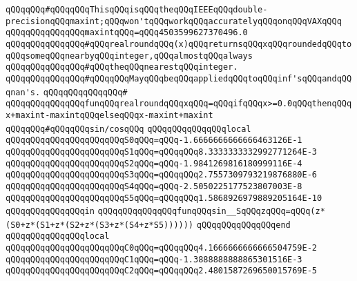 \newline
\verb|qQQqqQQq#qQQqqQQqThisqQQqisqQQqtheqQQqIEEEqQQqdouble-precisionqQQqmaxint;qQQqwon'tqQQqworkqQQqaccuratelyqQQqonqQQqVAXqQQq|\newline
\verb|qQQqqQQqqQQqqQQqmaxintqQQq=qQQq4503599627370496.0|\newline
\newline
\verb|qQQqqQQqqQQqqQQq#qQQqrealroundqQQq(x)qQQqreturnsqQQqxqQQqroundedqQQqtoqQQqsomeqQQqnearbyqQQqinteger,qQQqalmostqQQqalways|\newline
\verb|qQQqqQQqqQQqqQQq#qQQqtheqQQqnearestqQQqinteger.|\newline
\verb|qQQqqQQqqQQqqQQq#qQQqqQQqMayqQQqbeqQQqappliedqQQqtoqQQqinf'sqQQqandqQQqnan's.|\newline
\verb|qQQqqQQqqQQqqQQq#|\newline
\verb|qQQqqQQqqQQqqQQqfunqQQqrealroundqQQqxqQQq=qQQqifqQQqx>=0.0qQQqthenqQQqx+maxint-maxintqQQqelseqQQqx-maxint+maxint|\newline
\newline
\verb|qQQqqQQq#qQQqqQQqsin/cosqQQq|\newline
\verb|qQQqqQQqqQQqqQQqlocal|\newline
\verb|qQQqqQQqqQQqqQQqqQQqqQQqS0qQQq=qQQq-1.6666666666666463126E-1|\newline
\verb|qQQqqQQqqQQqqQQqqQQqqQQqS1qQQq=qQQqqQQq8.3333333332992771264E-3|\newline
\verb|qQQqqQQqqQQqqQQqqQQqqQQqS2qQQq=qQQq-1.9841269816180999116E-4|\newline
\verb|qQQqqQQqqQQqqQQqqQQqqQQqS3qQQq=qQQqqQQq2.7557309793219876880E-6|\newline
\verb|qQQqqQQqqQQqqQQqqQQqqQQqS4qQQq=qQQq-2.5050225177523807003E-8|\newline
\verb|qQQqqQQqqQQqqQQqqQQqqQQqS5qQQq=qQQqqQQq1.5868926979889205164E-10|\newline
\verb|qQQqqQQqqQQqqQQqin|\newline
\verb|qQQqqQQqqQQqqQQqfunqQQqsin__SqQQqzqQQq=qQQq(z*(S0+z*(S1+z*(S2+z*(S3+z*(S4+z*S5))))))|\newline
\verb|qQQqqQQqqQQqqQQqend|\newline
\newline
\verb|qQQqqQQqqQQqqQQqlocal|\newline
\verb|qQQqqQQqqQQqqQQqqQQqqQQqC0qQQq=qQQqqQQq4.1666666666666504759E-2|\newline
\verb|qQQqqQQqqQQqqQQqqQQqqQQqC1qQQq=qQQq-1.3888888888865301516E-3|\newline
\verb|qQQqqQQqqQQqqQQqqQQqqQQqC2qQQq=qQQqqQQq2.4801587269650015769E-5|\newline
